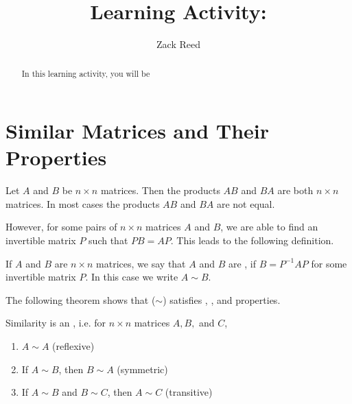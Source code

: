 \documentclass{ximera}
\author{Zack Reed}
\title{Learning Activity: }
\begin{document}
\begin{abstract}

    In this learning activity, you will be 
\end{abstract}
\maketitle

\section*{Similar Matrices and Their Properties}
 
Let $A$ and $B$ be $n \times n$ matrices.  Then the products $AB$ and $BA$ are both $n \times n$ matrices.  In most cases the products $AB$ and $BA$ are not equal.
 
However, for some pairs of $n \times n$ matrices $A$ and $B$, we are able to find an invertible matrix $P$ such that $PB = AP$.  This leads to the following definition.
 
\begin{definition}\label{def:similar}
If $A$ and $B$ are $n \times n$ matrices, we say that $A$ and $B$ are , if $B = P^{-1}AP$ for some invertible matrix $P$.  In this case we write $A \sim B$.
\end{definition}

  
The following theorem shows that  ($\sim$) satisfies , , and  properties. 
 
\begin{theorem}\label{th:similarityequivalence}
Similarity is an , i.e. for $n \times n$ matrices $A,B,$ and $C$,
\begin{enumerate}
\item\label{item:reflexive} $A \sim A$ (reflexive)
\item\label{item:symmetric} If $A \sim B$, then $B \sim A$ (symmetric)
\item\label{item:transitive} If $A \sim B$ and $B \sim C$, then $A \sim C$ (transitive)
\end{enumerate}
\end{theorem}
 
\end{document}
